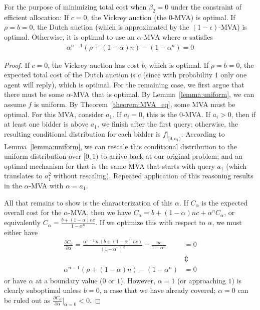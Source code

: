 \begin{proposition}
For the purpose of minimizing total cost when $\beta_2=0$ under the constraint of efficient allocation:
If $c = 0$, the Vickrey auction (the $0$-MVA) is optimal.
If $\rho = b = 0$, the Dutch auction (which is approximated by the
$(1-\epsilon)$-MVA) is optimal.  
Otherwise, it is optimal to use an $\alpha$-MVA where $\alpha$ satisfies
\begin{align}\label{eq:alpha}
\alpha^{n-1} (\rho + (1-\alpha)n) - (1-\alpha^n) = 0
\end{align}
\end{proposition}
\begin{proof}
If $c=0$, the Vickrey auction has cost $b$, which is optimal.
If $\rho=b=0$, the expected total cost of the Dutch auction is $c$ (since
with probability $1$ only one agent will reply), which is optimal.
For the remaining case, we first argue that there must be some $\alpha$-MVA
that is optimal.  
By  Lemma~\ref{lemma:uniform}, we can assume $f$ is uniform.
By Theorem~\ref{theorem:MVA_eq}, some MVA must be
optimal.  For this MVA, consider $a_1$.  If $a_i=0$, this is the
$0$-MVA. If $a_i>0$, then if at least one bidder is above $a_1$, we finish after
the first query; otherwise, the resulting conditional distribution for each
bidder is $f|_{[0,a_1)}$. According to Lemma~\ref{lemma:uniform}, we can
rescale this conditional distribution to the uniform distribution over
$[0,1)$ to arrive back at our original problem; and an optimal mechanism
for that is the same MVA that starts with query $a_1$ (which translates to
$a_1^2$ without rescaling).  Repeated application of this reasoning results
in the $\alpha$-MVA with $\alpha=a_1$.

All that remains to show is the characterization of this $\alpha$.
If $C_\alpha$ is the expected overall cost for the $\alpha$-MVA, then we
have $C_\alpha = b + (1-\alpha)nc + \alpha^n C_\alpha$, or equivalently 
$C_\alpha = \frac{b+(1-\alpha)nc }{ 1-\alpha^n}$.
If we optimize this with respect to $\alpha$, we must either have
\begin{align*}
\frac{\partial C_\alpha}{\partial \alpha} = \frac{{\alpha}^{n-1}\,n\,\left(
b+\left( 1-\alpha\right) \,nc\right) }{{\left( 1-{\alpha}^{n}\right)
}^{2}}-\frac{nc}{1-{\alpha}^{n}} &= 0 \nonumber\\
&\Updownarrow\nonumber\\
\alpha^{n-1} (\rho + (1-\alpha)n) - (1-\alpha^n) &= 0
\end{align*}
or have $\alpha$ at a boundary value ($0$ or $1$). However, $\alpha=1$ (or
approaching $1$) is clearly suboptimal unless $b=0$, a case that we have
already covered; $\alpha=0$ can be ruled out as $\frac{\partial
  C_\alpha}{\partial \alpha} |_{\alpha = 0} < 0$.
\end{proof}


